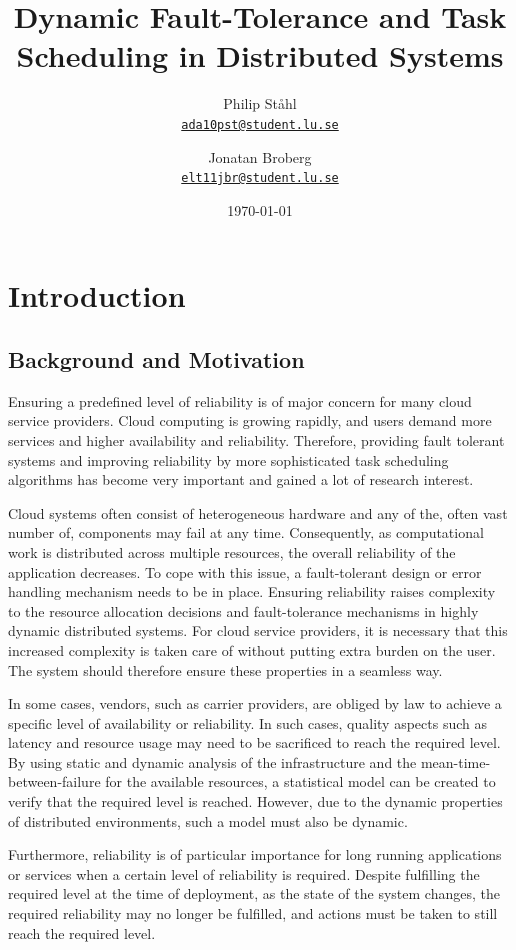 \documentclass{cslthse-msc}
\author{
	Philip Ståhl \\
	{\normalsize \href{mailto:ada10pst@student.lu.se}{\texttt{ada10pst@student.lu.se}}}
	\and
	Jonatan Broberg \\
    {\normalsize \href{mailto:elt11jbr@student.lu.se}{\texttt{elt11jbr@student.lu.se}}}
}
\title{Dynamic Fault-Tolerance and Task Scheduling in Distributed Systems}
\subtitle{}
\date{\today}
\begin{document}
\makefrontmatter

\chapter{Introduction} \label{ch:introduction} 
\section{Background and Motivation} \label{sec:introduction_backgroud_motivation}
Ensuring a predefined level of reliability is of major concern for many cloud service providers. Cloud computing is growing rapidly, and users demand more services and higher availability and reliability. Therefore, providing fault tolerant systems and improving reliability by more sophisticated task scheduling algorithms has become very important and gained a lot of research interest.

Cloud systems often consist of heterogeneous hardware and any of the, often vast number of, components may fail at any time. Consequently, as computational work is distributed across multiple resources, the overall reliability of the application decreases. To cope with this issue, a fault-tolerant design or error handling mechanism needs to be in place. Ensuring reliability raises complexity to the resource allocation decisions and fault-tolerance mechanisms in highly dynamic distributed systems. For cloud service providers, it is necessary that this increased complexity is taken care of without putting extra burden on the user. The system should therefore ensure these properties in a seamless way.

In some cases, vendors, such as carrier providers, are obliged by law to achieve a specific level of availability or reliability. In such cases, quality aspects such as latency and resource usage may need to be sacrificed to reach the required level. By using static and dynamic analysis of the infrastructure and the mean-time-between-failure for the available resources, a statistical model can be created to verify that the required level is reached. However, due to the dynamic properties of distributed environments, such a model must also be dynamic. 

Furthermore, reliability is of particular importance for long running applications or services when a certain level of reliability is required. Despite fulfilling the required level at the time of deployment, as the state of the system changes, the required reliability may no longer be fulfilled, and actions must be taken to still reach the required level.
\end{document}
